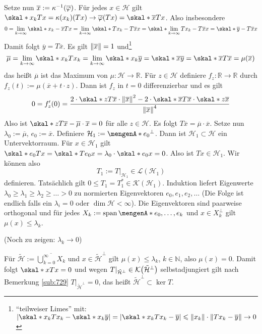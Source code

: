 Setze nun $\overline{x} := \kappa ^{-1}\enbrace*{\overline{\varphi}}$. Für jedes $x \in \mathcal{H}$ gilt  
$\skal*{x_k}{T x} = \kappa(x_k)(T x) \to \overline{\varphi}(T x) = \skal*{\overline{x}}{T x}$. Also insbesondere
\[
	0 = \lim_{k\to \infty} \skal*{x_k -\overline{x}}{T x} = \lim_{ k \to \infty} \skal*{T x_k - T \overline{x}}{x}= \skal*{\lim_{ k \to \infty} T x_k - T \overline{x} }{x}
	= \skal*{\overline{y} - T \overline{x}}{x}
\]
Damit folgt $\overline{y}=T \overline{x}$. Es gilt $\norm{\overline{x}}=1$ und\footnote{\enquote{teilweiser Limes} mit: 
$\abs*{\skal*{x_k}{T x_k} - \skal*{x_k}{\overline{y}}}=\abs*{\skal*{x_k}{T x_k - \overline{y}}} \le \norm{x_k} \cdot \norm{T x_k - \overline{y}} \to 0$}
\[
	\overline{\mu} = \lim_{ k \to \infty} \skal*{x_k}{T x_k} = \lim_{ k \to \infty}  \skal*{x_k}{\overline{y}} = \skal*{\overline{x}}{\overline{y}} = 
	\skal*{\overline{x}}{T \overline{x}} = \mu(\overline{x})
\]
das heißt $\overline{\mu}$ ist das Maximum von $\mu \colon \mathcal{H} \to \mathds{R}$. Für $z \in \mathcal{H}$ definiere $f_z \colon \mathds{R} \to \mathds{R}$ durch
$f_z(t) := \mu(\overline{x}+ t \cdot z)$. Dann ist $f_z$ in $t=0$ differenzierbar und es gilt
\[
	0 = f_z'(0) = \frac{2 \cdot \skal*{z}{T \overline{x}} \cdot \norm{\overline{x}}^2 - 2 \cdot \skal*{\overline{x}}{T \overline{x}} \cdot 
	\skal*{z}{\overline{x}}}{\norm{\overline{x}}^4} 
\]
Also ist $\skal*{z}{T \overline{x} - \overline{\mu} \cdot \overline{x}} =0$ für alle $z \in \mathcal{H}$. Es folgt $T \overline{x}= \overline{\mu} \cdot \overline{x}$.
Setze nun $\lambda_0 := \overline{\mu}$, $e_0:= \overline{x}$. Definiere $\mathcal{H}_1 := \set{e_0}^\bot$. Dann ist $\mathcal{H}_1 \subset \mathcal{H}$ ein Untervektorraum.
Für $x \in \mathcal{H}_1$ gilt $\skal*{e_0}{Tx} = \skal*{T e_0}{x}= \lambda_0 \cdot \skal*{e_0}{x}=0$. Also ist $Tx \in \mathcal{H}_1$. Wir können also 
\[
	T_1 := T\big|_{\mathcal{H}_1} \in \mathcal{L}(\mathcal{H}_1)
\]
definieren. Tatsächlich gilt $0 \le T_1 = T_1^* \in \mathcal{K}(\mathcal{H}_1)$. Induktion liefert Eigenwerte $\lambda_0 \ge \lambda_1 \ge \lambda_2 \ge \ldots>0$ zu
normierten Eigenvektoren $e_0, e_1, e_2, \ldots$ (Die Folge ist endlich falls ein $\lambda_i=0$ oder $\dim \mathcal{H} < \infty$). Die Eigenvektoren sind paarweise orthogonal
und für jedes $X_k := \Span \set{e_0, \ldots ,e_k}$ und $x \in X_k^\bot$ gilt $\mu(x) \le \lambda_k$.

(Noch zu zeigen: $\lambda_k \to 0$)

Für $\tilde{\mathcal{H}} := \overline{\bigcup_{k=0}^\infty X_k}$ und $x \in \tilde{\mathcal{H}}^\bot$ gilt $\mu(x) \le \lambda_k$, $k \in \mathds{N}$, also $\mu(x)=0$.
Damit folgt $\skal*{x}{T x}=0$ und wegen $T|_{\tilde{\mathcal{H}}^\bot} \in \mathcal{K} \enbrace[\big]{\tilde{\mathcal{H}}^\bot}$ selbstadjungiert gilt nach Bemerkung 
\ref{sub:729} $T|_{\tilde{\mathcal{H}}^\bot} =0$, das heißt $\tilde{\mathcal{H}}^\bot \subset \ker T$.

